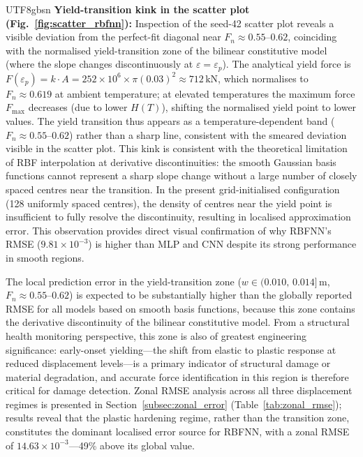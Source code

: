 \documentclass[a4paper,12pt]{report}
\begin{document}
\begin{CJK}{UTF8}{gbsn}
\textbf{Yield-transition kink in the scatter plot (Fig.~\ref{fig:scatter_rbfnn}):}
Inspection of the seed-42 scatter plot reveals a visible deviation from the perfect-fit
diagonal near $F_n \approx 0.55$--$0.62$, coinciding with the normalised yield-transition
zone of the bilinear constitutive model (where the slope changes discontinuously at
$\varepsilon = \varepsilon_p$). The analytical yield force is
$F(\varepsilon_p) = k \cdot A = 252\times10^6 \times \pi(0.03)^2 \approx 712\,\text{kN}$,
which normalises to $F_n \approx 0.619$ at ambient temperature; at elevated temperatures
the maximum force $F_{\max}$ decreases (due to lower $H(T)$), shifting the normalised
yield point to lower values. The yield transition thus appears as a temperature-dependent
band ($F_n \approx 0.55$--$0.62$) rather than a sharp line, consistent with the smeared
deviation visible in the scatter plot. This kink is consistent with the theoretical limitation
of RBF interpolation at derivative discontinuities: the smooth Gaussian basis functions
cannot represent a sharp slope change without a large number of closely spaced centres
near the transition. In the present grid-initialised configuration (128 uniformly spaced
centres), the density of centres near the yield point is insufficient to fully resolve
the discontinuity, resulting in localised approximation error. This observation provides
direct visual confirmation of why RBFNN's RMSE ($9.81\times10^{-3}$) is higher than
MLP and CNN despite its strong performance in smooth regions.

The local prediction error in the yield-transition zone
($w \in (0.010,\,0.014]$\,m, $F_n \approx 0.55$--$0.62$) is expected to be
substantially higher than the globally reported RMSE for all models based on smooth basis
functions, because this zone contains the derivative discontinuity of the bilinear
constitutive model. From a structural health monitoring perspective, this zone is also of
greatest engineering significance: early-onset yielding---the shift from elastic to plastic
response at reduced displacement levels---is a primary indicator of structural damage or
material degradation, and accurate force identification in this region is therefore
critical for damage detection. Zonal RMSE analysis across all three displacement regimes
is presented in Section~\ref{subsec:zonal_error} (Table~\ref{tab:zonal_rmse}); results
reveal that the plastic hardening regime, rather than the transition zone, constitutes
the dominant localised error source for RBFNN, with a zonal RMSE of
$14.63 \times 10^{-3}$---49\% above its global value.


\end{CJK}
\end{document}
